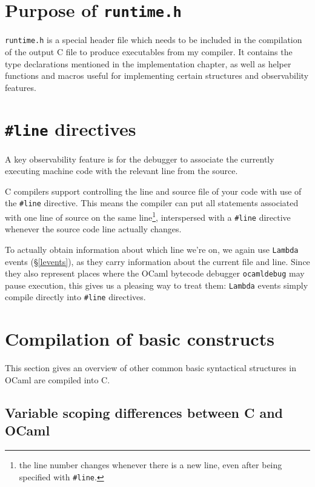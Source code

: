 \documentclass[12pt,a4paper,twoside,openright]{report}
\begin{document}
\section{Purpose of \texttt{runtime.h}}

\texttt{runtime.h} is a special header file which needs to be included in the
compilation of the output C file to produce executables from my compiler. It
contains the type declarations mentioned in the implementation chapter, as well
as helper functions and macros useful for implementing certain structures and
observability features.

\section{\texttt{\#}\texttt{line} directives} \label{line-directive}

A key observability feature is for the debugger to associate the currently
executing machine code with the relevant line from the source.

C compilers support controlling the line and source file of your code with use
of the \texttt{\#}\texttt{line} directive. This means the compiler can put all
statements associated with one line of source on the same line\footnote{the line
    number changes whenever there is a new line, even after being specified with
\texttt{\#}\texttt{line}.}, interspersed with a \verb|#line| directive whenever
the source code line actually changes.

To actually obtain information about which line we're on, we again use
\texttt{Lambda} events (\S\ref{levents}), as they carry information about the
current file and line. Since they also represent places where the OCaml bytecode
debugger \texttt{ocamldebug} may pause execution, this gives us a pleasing way
to treat them: \texttt{Lambda} events simply compile directly into \verb|#line|
directives.


\section{Compilation of basic constructs} \label{basic-constructs}

This section gives an overview of other common basic syntactical structures
in OCaml are compiled into C.

\subsection{Variable scoping differences between C and OCaml}
\label{variable-scoping}
\end{document}
